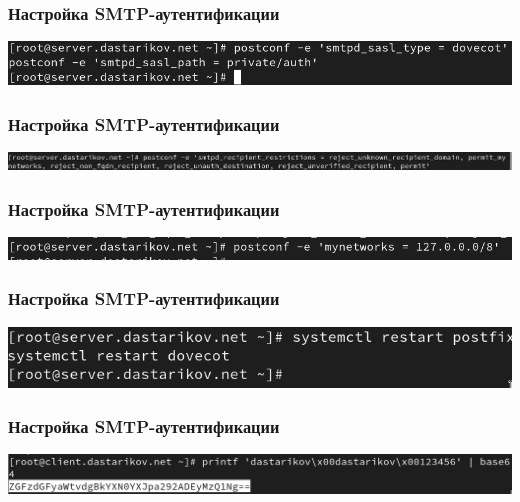 \begin{frame}
  \frametitle{Настройка SMTP-аутентификации}
  \centering
  \includegraphics[width=\textwidth]{../images/image09.png}
\end{frame}

\begin{frame}
  \frametitle{Настройка SMTP-аутентификации}
  \centering
  \includegraphics[width=\textwidth]{../images/image10.png}
\end{frame}

\begin{frame}
  \frametitle{Настройка SMTP-аутентификации}
  \centering
  \includegraphics[width=\textwidth]{../images/image11.png}
\end{frame}

\begin{frame}
  \frametitle{Настройка SMTP-аутентификации}
  \centering
  \includegraphics[width=\textwidth]{../images/image13.png}
  \label{13}
\end{frame}

\begin{frame}
  \frametitle{Настройка SMTP-аутентификации}
  \centering
  \includegraphics[width=\textwidth]{../images/image14.png}
\end{frame}

